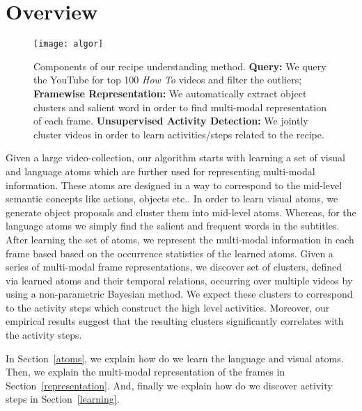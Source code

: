 \section{Overview}
\label{sec:overview}
\begin{figure}[h]
  \texttt{[image: algor]}
  \caption{Components of our recipe understanding method. \textbf{Query:} We query the YouTube for top 100 \emph{How To} videos and filter the outliers; \textbf{Framewise Representation:} We automatically extract object clusters and salient word in order to find multi-modal representation of each frame. \textbf{Unsupervised Activity Detection:} We jointly cluster videos in order to learn activities/steps related to the recipe.}
\label{fig:overview}
\end{figure}

Given a large video-collection, our algorithm starts with learning a set of visual and language atoms which are further used for representing multi-modal information. These atoms are designed in a way to correspond to the mid-level semantic concepts like actions, objects etc.. In order to learn visual atoms, we generate object proposals and cluster them into mid-level atoms. Whereas, for the language atoms we simply find the salient and frequent words in the subtitles. After learning the set of atoms, we represent the multi-modal information in each frame based based on the occurrence statistics of the learned atoms. Given a series of multi-modal frame representations, we discover set of clusters, defined via learned atoms and their temporal relations, occurring over multiple videos by using a non-parametric Bayesian method. We expect these clusters to correspond to the activity steps which construct the high level activities. Moreover, our empirical results suggest that the resulting clusters significantly correlates with the activity steps.

In Section~\ref{atoms}, we explain how do we learn the language and visual atoms. Then, we explain the multi-modal representation of the frames in Section~\ref{representation}. And, finally we explain how do we discover activity steps in Section~\ref{learning}.



